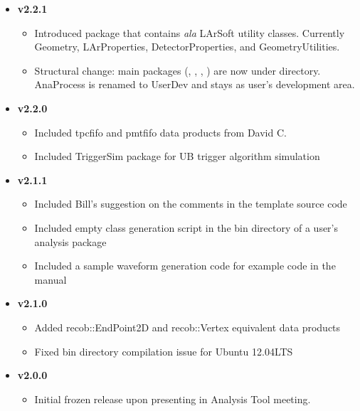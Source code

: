 \begin{itemize}
\item[] {\bf v2.2.1}
  \begin{itemize}
    \item Introduced \LArUtil package that contains {\it ala} LArSoft utility classes. Currently {\ttfamily Geometry}, {\ttfamily LArProperties}, {\ttfamily DetectorProperties}, and {\ttfamily GeometryUtilities}.
    \item Structural change: main packages (\Base, \DataFormat, \Analysis, \LArUtil) are now under \Core directory. {\ttfamily AnaProcess} is renamed to {\ttfamily UserDev} and stays as user's development area.
  \end{itemize}

\item[] {\bf v2.2.0}
  \begin{itemize}
    \item Included {\ttfamily tpcfifo} and {\ttfamily pmtfifo} data products from David C.
    \item Included TriggerSim package for UB trigger algorithm simulation
  \end{itemize}

\item[] {\bf v2.1.1}
  \begin{itemize}
    \item Included Bill's suggestion on the comments in the template source code
    \item Included empty \CPP class generation script in the bin directory of a user's analysis package
    \item Included a sample waveform generation code for example code in the manual
  \end{itemize}

\item[] {\bf v2.1.0}
  \begin{itemize}
    \item Added {\ttfamily recob::EndPoint2D} and {\ttfamily recob::Vertex} equivalent data products
    \item Fixed {\ttfamily bin} directory compilation issue for Ubuntu 12.04LTS
  \end{itemize}

\item[] {\bf v2.0.0}
  \begin{itemize}
    \item Initial frozen release upon presenting in Analysis Tool meeting. 
  \end{itemize}

\end{itemize}

